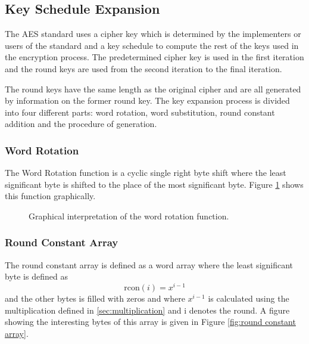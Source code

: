 \documentclass[report.tex]{subfiles}
\begin{document}
\subsection{Key Schedule Expansion} \label{key schedule}

The AES standard uses a cipher key which is determined by the implementers or users of the standard and a key schedule to compute the rest of the keys used in the encryption process. %
The predetermined cipher key is used in the first iteration and the round keys are used from the second iteration to the final iteration.

The round keys have the same length as the original cipher and are all generated by information on the former round key. The key expansion process is divided into four different parts: word rotation, word substitution, round constant addition and the procedure of generation.

\subsubsection{Word Rotation}
The Word Rotation function is a cyclic single right byte shift where the least significant byte is shifted to the place of the most significant byte. Figure \ref{fig:word shift} shows this function graphically.

\begin{figure}[ht]
\setlength{\unitlength}{1.0cm}
	\begin{center}
	\end{center}
	\caption{Graphical interpretation of the word rotation function.}
	\label{fig:word shift}
\end{figure}

\subsubsection{Round Constant Array}
The round constant array is defined as a word array where the least significant byte is defined as
\begin{equation}
	\textrm{rcon}\left(i\right) = x^{i - 1}
\end{equation}
and the other bytes is filled with zeros and where $x^{i - 1}$ is calculated using the multiplication defined in  \ref{sec:multiplication} and i denotes the round. A figure showing the interesting bytes of this array is given in Figure \ref{fig:round constant array}.
\end{document}
